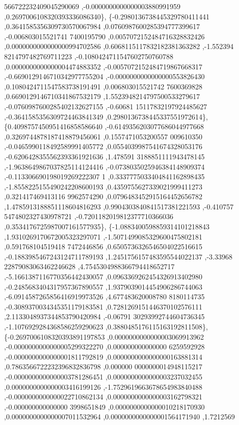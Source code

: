 \begin{DoxyCode}
      566722232409045290069 ,-0.0000000000000003880991959 ,0.2697006108320393336086340\},
\{-0.2980136738445329780411441 ,0.3641585356309730570067984 ,0.0760987600285394777399617 ,-0.006803015521741
      7400195790 ,0.0057072152484716328832426 ,0.0000000000000000994702586 ,0.6068115117832182381363282 ,-1.552394
      8214797482769711223 ,-0.1080424711547602750760788 ,0.0000000000000004474883352 ,-0.0057072152484719867668317
       ,-0.6690129146710342977755204 ,-0.0000000000000000553826430 ,0.1080424711547583738191491 ,0.006803015521742
      7600369828 ,0.6690129146710341867532179 ,1.5523948214797500533279617 ,-0.0760987600285402132627155 ,-0.60681
      15117832197924485627 ,-0.3641585356309724463841349 ,0.2980136738445337551972614\},
\{0.4098757450951416858586640 ,-0.6149356203077686044977668 ,0.3269744878187418879456061 ,0.1557471053200557
      009610350 ,-0.0465990118492589991405772 ,0.0554039987541674328053176 ,-0.6206428355562393361921636 ,1.478591
      3188851111943478145 ,-1.9638649867037825114124416 ,-0.0738035025946384148909374 ,-0.113306690198019269222307
      1 ,0.3337775033404841162898435 ,-1.8558225155490242208600193 ,0.4359755627339021999411273 ,0.321417469413116
      9962574290 ,0.0796483452915164452656782 ,1.4785913188851118604816293 ,0.9904303840841517381221593 ,-0.410757
      5474802327430978721 ,-0.7201182019812377710366036 ,0.3534176725987007161577935\},
\{-1.0883400598859314101218843 ,1.9310269170672005323297071 ,-1.5071499085329600475802181 ,0.591768104519418
      7472446856 ,0.6505736326546504022516615 ,-0.1883985467243124711789193 ,1.2451756157483595544022137 ,-3.33968
      22879083063462246628 ,4.7545304988366794418652717 ,-5.1661387116770356442430057 ,0.0963369262454326913402980
       ,-0.2485683404317957367890557 ,1.9379039014454906286744063 ,-6.0914587265856416919973526 ,4.677483620008780
      8180114735 ,-0.3089370034345351179183581 ,0.7281269151446370102576111 ,2.1133048937344853790420984 ,-0.06791
      30293992744604736345 ,-1.1076929284368586259290623 ,0.3880485176115163192811508\},
\{-0.2697006108320393891197853 ,0.0000000000000003069913962 ,-0.0000000000000005299322270 ,0.000000000000000
      6259592928 ,-0.0000000000000001811792819 ,0.0000000000000000163881314 ,0.7863566722232396832836798 ,0.000000
      0000000014948115217 ,-0.0000000000000003781286451 ,0.0000000000000003237032455 ,0.0000000000000003416199126 
      ,-1.7529619663678654983840488 ,-0.0000000000000022710862134 ,0.0000000000000003162798321 ,-0.000000000000000
      3998651849 ,0.0000000000000010218170930 ,0.0000000000000007011532964 ,0.0000000000000001564171940 ,1.7212569

\end{DoxyCode}
